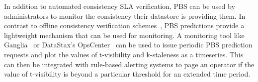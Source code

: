 
In addition to automated consistency SLA verification, PBS can be used by administrators
to monitor the consistency their datastore is providing them. In contrast to
offline consistency verification schemes~\cite{podc-hpl}, PBS predictions provide
a lightweight mechanism that can be used for monitoring. A monitoring tool like
Ganglia~\cite{massie2004ganglia} or DataStax's OpsCenter~\cite{datastax-opscenter} can be used to
issue  periodic PBS prediction requests and plot the values of t-visibility and
k-staleness as a timeseries. This can then be integrated with rule-based
alerting systems to page an operator if the value of t-visibility is beyond a
particular threshold for an extended time period.

